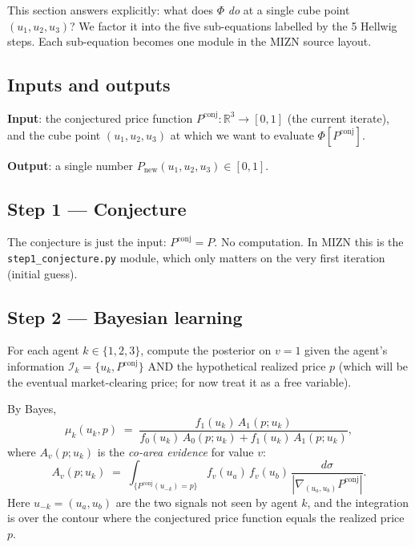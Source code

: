 \documentclass[10pt,twocolumn,a4paper]{article}
\begin{document}
This section answers explicitly: what does $\Phi$ \emph{do} at a single
cube point $(u_1, u_2, u_3)$? We factor it into the five sub-equations
labelled by the 5 Hellwig steps. Each sub-equation becomes one module in
the MIZN source layout.

\subsection*{Inputs and outputs}

\textbf{Input}: the conjectured price function $P^{\text{conj}}: \mathbb{R}^3
\to [0,1]$ (the current iterate), and the cube point $(u_1, u_2, u_3)$ at
which we want to evaluate $\Phi[P^{\text{conj}}]$.

\textbf{Output}: a single number $P_{\text{new}}(u_1, u_2, u_3) \in [0,1]$.

\subsection{Step 1 --- Conjecture}

The conjecture is just the input: $P^{\text{conj}} = P$. No computation.
In MIZN this is the \texttt{step1\_conjecture.py} module, which only matters
on the very first iteration (initial guess).

\subsection{Step 2 --- Bayesian learning}

For each agent $k \in \{1, 2, 3\}$, compute the posterior on $v=1$ given
the agent's information $\mathcal{I}_k = \{u_k, P^{\text{conj}}\}$ AND the
hypothetical realized price $p$ (which will be the eventual market-clearing
price; for now treat it as a free variable).

By Bayes,
\begin{equation}
\mu_k(u_k, p)
\;=\;
\frac{f_1(u_k)\, A_1(p; u_k)}
     {f_0(u_k)\, A_0(p; u_k) + f_1(u_k)\, A_1(p; u_k)},
\label{eq:bayes}
\end{equation}
where $A_v(p; u_k)$ is the \emph{co-area evidence} for value $v$:
\begin{equation}
A_v(p; u_k) \;=\; \int_{\{P^{\text{conj}}(u_{-k}) = p\}}
f_v(u_a)\, f_v(u_b)\,\frac{d\sigma}{|\nabla_{(u_a, u_b)} P^{\text{conj}}|}.
\label{eq:coarea}
\end{equation}
Here $u_{-k} = (u_a, u_b)$ are the two signals not seen by agent $k$, and
the integration is over the contour where the conjectured price function
equals the realized price $p$.
\end{document}
